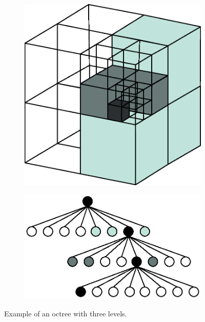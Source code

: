 \begin{figure}[h]
    \centering
    \begin{subfigure}[c]{0.33\textwidth}
        \vspace{0pt}
        \centering
        \includegraphics[width=\textwidth]{sections/theory/figures/octree-cube.eps}
    \end{subfigure}
    \hspace{1cm}
    \begin{subfigure}[c]{0.5\textwidth}
        \vspace{0pt}
        \centering
        \includegraphics[width=\textwidth]{sections/theory/figures/octree-tree.eps}
    \end{subfigure}
    \caption{Example of an octree with three levels.}
    \label{fig:octree-example}
\end{figure}

